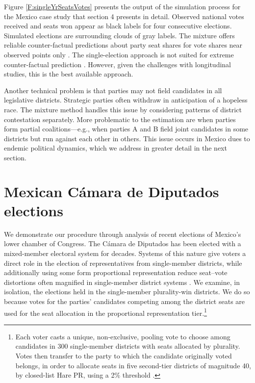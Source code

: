 \documentclass[letter,12pt]{article}
\begin{document}
Figure \ref{F:singleYrSeatsVotes} presents the output of the simulation process for the Mexico case study that section 4 presents in detail. Observed national votes received and seats won appear as black labels for four consecutive elections. Simulated elections are surrounding clouds of gray labels. The mixture offers reliable counter-factual predictions about party seat shares for vote shares near observed points only \citep[about $\pm5$ percent,][:fn.\ 8]{linzerSeatVoteElasticity2012}. The single-election approach is not suited for extreme counter-factual prediction \citep[something generally true for any approach,][]{gelman.king.1994EvalElSysRedis}. However, given the challenges with longitudinal studies, this is the best available approach.


Another technical problem is that parties may not field candidates in all legislative districts. Strategic parties often withdraw in anticipation of a hopeless race. The mixture method handles this issue by considering patterns of district contestation separately. More problematic to the estimation are when parties form partial coalitions---e.g., when parties A and B field joint candidates in some districts but run against each other in others. This issue occurs in Mexico dues to endemic political dynamics, which we address in greater detail in the next section. 

\section{Mexican C\'amara de Diputados elections}

We demonstrate our procedure through analysis of recent elections of Mexico's lower chamber of Congress. The C\'amara de Diputados has been elected with a mixed-member electoral system for decades. Systems of this nature give voters a direct role in the election of representatives from single-member districts, while additionally using some form proportional representation reduce seat--vote distortions often magnified in single-member district systems \citep{shugart.wattenbergIntro2001}. We examine, in isolation, the elections held in the single-member plurality-win districts. We do so because votes for the parties' candidates competing among the district seats are used for the seat allocation in the proportional representation tier.\footnote{Each voter casts a unique, non-exclusive, pooling vote to choose among candidates in 300 single-member districts with seats allocated by plurality. Votes then transfer to the party to which the candidate originally voted belongs, in order to allocate seats in five second-tier districts of magnitude 40, by closed-list Hare PR, using a 2\% threshold \citep{weldonMixedMemberSys2001}.} 
\end{document}
